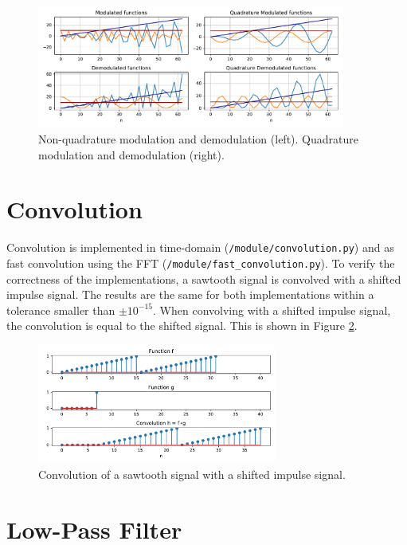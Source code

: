 \documentclass[12pt, a4paper]{report}
\begin{document}
\begin{figure}[h!]
	\centering
	\includegraphics[width=0.9\textwidth]{figures/modulation.pdf}
	\caption{Non-quadrature modulation and demodulation (left). Quadrature modulation and demodulation (right).}
	\label{fig:modulation_visualizations}
\end{figure}

\section{Convolution}

Convolution is implemented in time-domain (\texttt{/module/convolution.py})
and as fast convolution using the \ac{FFT} (\texttt{/module/fast\_convolution.py}).
To verify the correctness of the implementations,
a sawtooth signal is convolved with a shifted impulse signal.
The results are the same for both implementations within a tolerance smaller than \(\pm10^{-15}\).
When convolving with a shifted impulse signal, the convolution is equal to the shifted signal.
This is shown in Figure \ref{fig:convolution}.
\begin{figure}[h!]
	\centering
	\includegraphics[width=0.7\textwidth]{figures/convolution.pdf}
	\caption{Convolution of a sawtooth signal with a shifted impulse signal.}
	\label{fig:convolution}
\end{figure}

\section{Low-Pass Filter}
\end{document}
